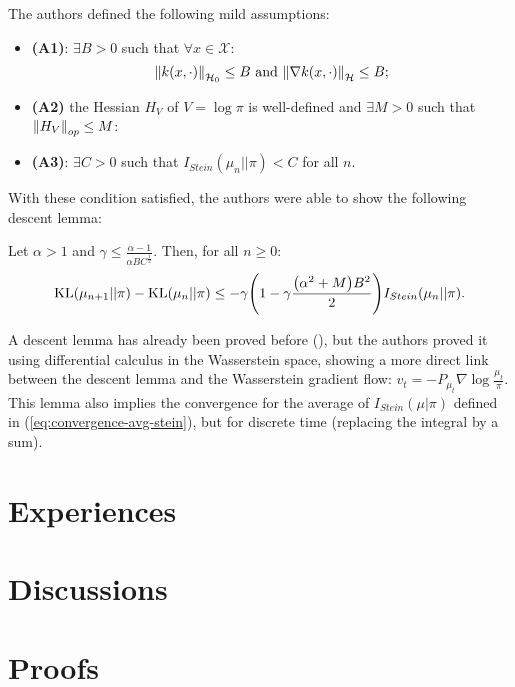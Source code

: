 \documentclass[runningheads,a4paper]{llncs}
\newcommand{\X}{\mathcal{X}}
\newcommand{\KL}{\mathrm{KL}}
\renewcommand{\H}{\mathcal{H}}
\newcommand{\Stein}{I_{Stein}(\mu | \pi)}
\DeclarePairedDelimiter{\norm}{\|}{\|}
\DeclarePairedDelimiter{\pare}{(}{)}
\begin{document}
The authors defined the following mild assumptions:
\begin{itemize}
  \item {\bf (A1)}: $\exists B > 0$ such that $\forall x \in \X$:
    $$
    \norm*{k(x, \cdot)}_{\H_0} \leq B \text{ and } \norm*{\nabla k(x, \cdot)}_{\H} \leq B;
    $$
  \item {\bf (A2)} the Hessian $H_V$ of $V = \log \pi$ is well-defined and
    $\exists M > 0$ such that $\norm*{H_V}_{op} \leq M$:
  \item {\bf (A3)}: $\exists C > 0$ such that $I_{Stein}(\mu_n || \pi) < C$ for all $n$.
\end{itemize}
With these condition satisfied, the authors were able to show the following descent
lemma:
\begin{lemma}
  Let $\alpha > 1$ and $\gamma \leq \frac{\alpha-1}{\alpha B C^{\frac{1}{2}}}$.
  Then, for all $n \geq 0$:
  $$
  \KL(\mu_{n+1} || \pi) - \KL(\mu_n || \pi) \leq - \gamma \pare*{1 - \gamma
  \frac{\pare*{ \alpha^2 + M} B^2 }{2}} I_{Stein}(\mu_n || \pi).
  $$
\end{lemma}
A descent lemma has already been proved before (\cite{SVGD-flow}),
but the authors proved it using differential calculus in the Wasserstein space,
showing a more direct link between the descent lemma and the 
Wasserstein gradient flow: $v_t = -P_{\mu_t} \nabla \log \frac{\mu_t}{\pi}$.
This lemma also implies the convergence for the average of $\Stein$
defined in (\ref{eq:convergence-avg-stein}), but for discrete time (replacing the
integral by a sum).

\section{Experiences}

\section{Discussions}





\appendix
\section{Proofs}
\end{document}
